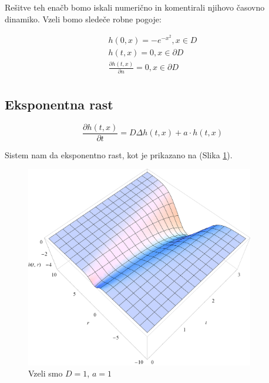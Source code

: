 \documentclass[a4paper, oneside, 12pt]{book}
\begin{document}
          Rešitve teh enačb bomo iskali numerično in komentirali njihovo časovno dinamiko. Vzeli bomo sledeče robne pogoje:

        \begin{equation}
          \begin{aligned}
            h(0,x) =  - e^{-x^2}, x \in D \\
            h(t,x) = 0, x \in \partial D \\
            \frac{\partial h(t,x)}{\partial n} = 0, x \in \partial D \\
          \end{aligned}
        \end{equation}


          \subsection{Eksponentna rast}

            \begin{equation}
              \frac{ \partial h(t,x) }{ \partial t} = D \Delta h(t,x) + a \cdot h(t,x)
              \label{difuzija-eksponentna-rast}
            \end{equation}

            Sistem nam da eksponentno rast, kot je prikazano na (Slika \ref{fig:difuzija-eksponentna-rast}).

            \begin{figure}[H]
              \begin{center}
                \includegraphics[width=10cm]{slike/difuzija-eksponentna-rast2}
              \end{center}
              \caption{Vzeli smo $D=1$, $a=1$}
              \label{fig:difuzija-eksponentna-rast}
            \end{figure}
\end{document}
